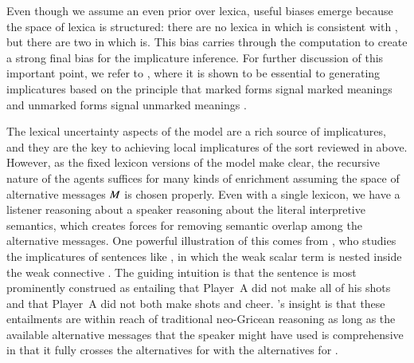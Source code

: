 \documentclass[leqno,12pt]{article}
\begin{document}
Even though we assume an even prior over lexica, useful biases emerge
because the space of lexica is structured: there are no lexica in
which  is consistent with , but there are two in
which  is. This bias carries through the computation to
create a strong final bias for the implicature inference. For further
discussion of this important point, we refer to
\citealt{Bergen:Levy:Goodman:2014}, where it is shown to be essential
to generating implicatures based on the principle that marked forms
signal marked meanings and unmarked forms signal unmarked meanings
\citep{McCawley78,Horn84,Blutner98,Levinson00}.


The lexical uncertainty aspects of the model are a rich source of
implicatures, and they are the key to achieving local implicatures of
the sort reviewed in  above. However, as the
fixed lexicon versions of the model make clear, the recursive nature
of the agents suffices for many kinds of enrichment assuming the space
of alternative messages $M$ is chosen properly. Even with a
single lexicon, we have a listener reasoning about a speaker reasoning
about the literal interpretive semantics, which creates forces for
removing semantic overlap among the alternative messages. One powerful
illustration of this comes from \citet{Sauerland01,Sauerland04}, who
studies the implicatures of sentences like , in which the weak scalar term  is nested inside the weak connective . The
guiding intuition is that the sentence is most prominently construed
as entailing that Player~A did not make all of his shots and that
Player~A did not both make shots and cheer. \citeauthor{Sauerland01}'s
insight is that these entailments are within reach of traditional
neo-Gricean reasoning as long as the available alternative messages
that the speaker might have used is comprehensive in that it fully
crosses the alternatives for  with the alternatives for
.
\end{document}
